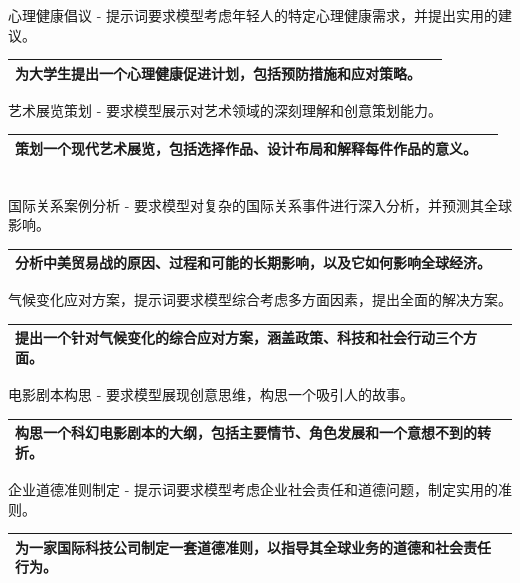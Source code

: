 \documentclass[12pt]{book}
\begin{document}
\bigskip
心理健康倡议  - 提示词要求模型考虑年轻人的特定心理健康需求，并提出实用的建议。

\begin{tabular}{|p{15cm}|p{3cm}|}
	\hline
为大学生提出一个心理健康促进计划，包括预防措施和应对策略。\\
	\hline
\end{tabular}


\bigskip
艺术展览策划  - 要求模型展示对艺术领域的深刻理解和创意策划能力。

\begin{tabular}{|p{15cm}|p{3cm}|}
	\hline
	策划一个现代艺术展览，包括选择作品、设计布局和解释每件作品的意义。\\
	\hline
\end{tabular}\\




\bigskip
国际关系案例分析  - 要求模型对复杂的国际关系事件进行深入分析，并预测其全球影响。

\begin{tabular}{|p{15cm}|p{3cm}|}
	\hline
分析中美贸易战的原因、过程和可能的长期影响，以及它如何影响全球经济。\\
	\hline
\end{tabular}



\bigskip
气候变化应对方案，提示词要求模型综合考虑多方面因素，提出全面的解决方案。

\begin{tabular}{|p{15cm}|p{3cm}|}
	\hline
提出一个针对气候变化的综合应对方案，涵盖政策、科技和社会行动三个方面。\\
	\hline
\end{tabular}


\bigskip
电影剧本构思  - 要求模型展现创意思维，构思一个吸引人的故事。

\begin{tabular}{|p{15cm}|p{3cm}|}
	\hline
构思一个科幻电影剧本的大纲，包括主要情节、角色发展和一个意想不到的转折。\\
	\hline
\end{tabular}


\bigskip
企业道德准则制定  - 提示词要求模型考虑企业社会责任和道德问题，制定实用的准则。

\begin{tabular}{|p{15cm}|p{3cm}|}
	\hline
为一家国际科技公司制定一套道德准则，以指导其全球业务的道德和社会责任行为。\\
	\hline
\end{tabular}
\end{document}
